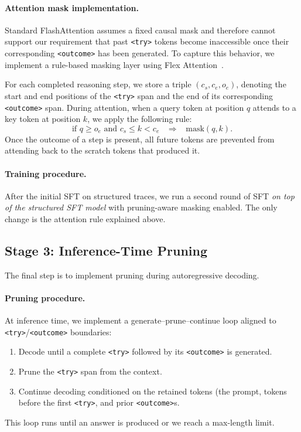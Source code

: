 \documentclass{article}
\begin{document}
\paragraph{Attention mask implementation.}
Standard FlashAttention assumes a fixed causal mask and therefore cannot support our requirement that past \texttt{<try>} tokens become inaccessible once their corresponding \texttt{<outcome>} has been generated. To capture this behavior, we implement a rule-based masking layer using Flex Attention~\citep{dong2024flex}. 

For each completed reasoning step, we store a triple
\((c_s, c_e, o_e)\), denoting the start and end positions of the \texttt{<try>} span and the end of its corresponding \texttt{<outcome>} span. During attention, when a query token at position $q$ attends to a key token at position $k$, we apply the following rule:
\[
\text{if } q \ge o_e \text{ and } c_s \le k < c_e \;\;\;\Rightarrow\;\;\; \text{mask}(q,k).
\]
Once the outcome of a step is present, all future tokens are prevented from attending back to the scratch tokens that produced it. 





\paragraph{Training procedure.}
After the initial SFT on structured traces, we run a second round of SFT \emph{on top of the structured SFT model} with pruning-aware masking enabled. The only change is the attention rule explained above.

\subsection{Stage 3: Inference-Time Pruning}
The final step is to implement pruning during autoregressive decoding. 

\paragraph{Pruning procedure.}
At inference time, we implement a generate--prune--continue loop aligned to \texttt{<try>}/\texttt{<outcome>} boundaries:
\begin{enumerate}[leftmargin=*]
    \item Decode until a complete \texttt{<try>} followed by its \texttt{<outcome>} is generated.
    \item Prune the \texttt{<try>} span from the context.
    \item Continue decoding conditioned on the retained tokens (the prompt, tokens before the first \texttt{<try>},  and prior \texttt{<outcome>}s.
\end{enumerate}
This loop runs until an answer is produced or we reach a max-length limit.
\end{document}
